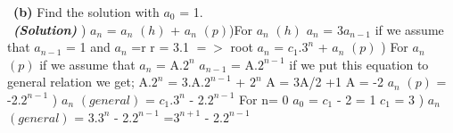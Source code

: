 \documentclass[a4 paper]{article}
\numberwithin{equation}{section}
\newcommand{\subproblem}[1]{~\newline\textbf{(#1)}}
\newcommand{\solution}{~\newline\textbf{\textit{(Solution)}} }
\newcommand{\0}{\mathbf{0}}
\begin{document}
\subproblem{b} Find the solution with $a_0$ = 1.\\
\solution
{}) $a_n$ = $a_n$ $(h)$ + $a_n$ $(p)$)For  $a_n$ $(h)$ \newline
$a_n$ = 3$a_{n-1}$ \newline
if we assume that  $a_{n-1}$ = 1  and $a_n$ =r \newline
r = 3.1  $=>$ root \newline
$a_n$ = $c_1$.$3^{n}$ + $a_n$ $(p)$ ) For $a_n$ $(p)$ \newline
if we assume that $a_n$ = A.$2^{n}$ \newline
$a_{n-1}$ = A.$2^{n-1}$ \newline
if we put this equation to general relation we get;\newline
A.$2^{n}$ = 3.A.$2^{n-1}$ + $2^{n}$ \newline
A = 3A/2 +1 \newline
A = -2 \newline
$a_n$ $(p)$ = -2.$2^{n-1}$ ) $a_n$ $(general)$ = $c_1$.$3^{n}$ - 2.$2^{n-1}$ \newline
For n= 0 $a_0$ = $c_1$ - 2 = 1 \newline
$c_1$ = 3 )  $a_n$ $(general)$ = 3.$3^{n}$ - 2.$2^{n-1}$ =$3^{n+1}$ - 2.$2^{n-1}$  \newline
\end{document}
